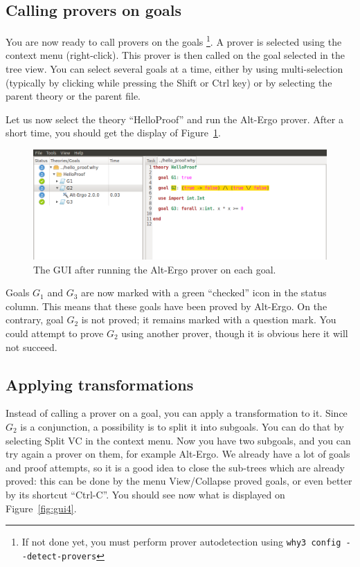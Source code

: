 \subsection{Calling provers on goals}

You are now ready to call provers on the goals
\footnote{If not done yet, you
  must perform prover autodetection using \texttt{why3 config
    -{}-detect-provers}}.
A prover is selected using the context menu (right-click).
This prover is then called on the goal selected
in the tree view. You can select several goals at a time, either
by using multi-selection (typically by clicking while pressing the
\textsf{Shift} or \textsf{Ctrl} key) or by selecting the parent theory
or the parent file.

Let us now select the theory ``HelloProof'' and
run the Alt-Ergo prover. After a short time, you should
get the display of Figure~\ref{fig:gui3}.
\begin{figure}[tbp]
\includegraphics[width=\textwidth]{gui-3.png}
  \caption{The GUI after running the Alt-Ergo prover on each goal.}
  \label{fig:gui3}
\end{figure}
Goals $G_1$ and $G_3$ are now marked with a green ``checked'' icon in the
status column. This means that these goals have been proved by Alt-Ergo.
On the contrary, goal $G_2$ is not proved; it remains
marked with a question mark.
You could attempt to prove $G_2$ using another prover, though it is
obvious here it will not succeed.

\subsection{Applying transformations}

Instead of calling a prover on a goal, you can apply a transformation
to it.  Since $G_2$ is a conjunction, a possibility is to split it
into subgoals. You can do that by selecting \textsf{Split VC} in the
context menu. Now you have two subgoals, and you can try again a
prover on them, for example Alt-Ergo. We already have a lot of goals
and proof attempts, so it is a good idea to close the sub-trees which
are already proved: this can be done by the menu \textsf{View/Collapse
  proved goals}, or even better by its shortcut ``Ctrl-C''.  You
should see now what is displayed on Figure~\ref{fig:gui4}.

